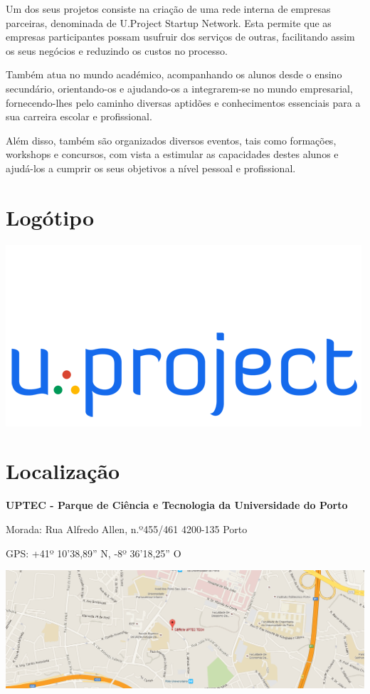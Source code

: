 \documentclass[11pt]{report}
\begin{document}
Um dos seus projetos consiste na criação de uma rede interna de empresas parceiras, denominada de U.Project Startup Network. Esta permite que as empresas participantes possam usufruir dos serviços de outras, facilitando assim os seus negócios e reduzindo os custos no processo.

Também atua no mundo académico, acompanhando os alunos desde o ensino secundário, orientando-os e ajudando-os a integrarem-se no mundo empresarial, fornecendo-lhes pelo caminho diversas aptidões e conhecimentos essenciais para a sua carreira escolar e profissional. 

Além disso, também são organizados diversos eventos, tais como formações, workshops e concursos, com vista a estimular as capacidades destes alunos e ajudá-los a cumprir os seus objetivos a nível pessoal e profissional.
\section{Logótipo}
\begin{center}
\includegraphics [scale=0.5]{uplogo500.png}
\end{center}
\section{Localização}
\textbf{UPTEC - Parque de Ciência e Tecnologia da Universidade do Porto} 


Morada:
Rua Alfredo Allen, n.º455/461
4200-135 Porto


GPS:
+41º 10'38,89'' N, -8º 36'18,25'' O


\includegraphics [scale=0.35]{location.png}
\end{document}

